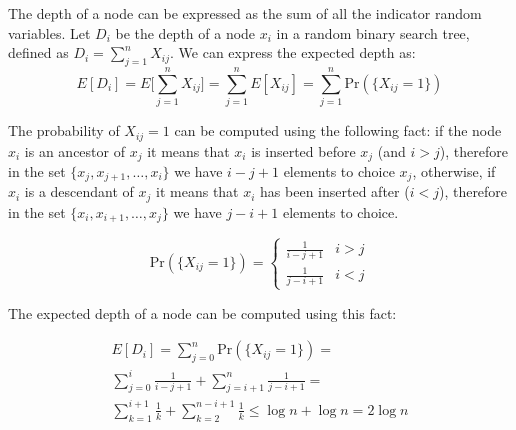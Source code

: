 \documentclass{article}
\begin{document}
\noindent The depth of a node can be expressed as the sum of all the indicator random variables. Let $D_i$ be the depth of a node $x_i$ in a random binary search tree, defined as $D_i = \sum_{j = 1}^{n} X_{ij}$. We can express the expected depth as:
\begin{equation}
E[D_i] = E\bigg[\sum_{j = 1}^{n} X_{ij}\bigg] = \sum_{j = 1}^{n} E[X_{ij}] = \sum_{j = 1}^{n} \textrm{Pr}(\{X_{ij} = 1\})
\end{equation}

\noindent The probability of $X_{ij} = 1$ can be computed using the following fact: if the node $x_i$ is an ancestor of $x_j$ it means that $x_i$ is inserted before $x_j$ (and $i > j$), therefore in the set $\{x_j, x_{j + 1}, \dots, x_{i}\}$ we have $i - j + 1$ elements to choice $x_j$, otherwise, if $x_i$ is a descendant of $x_j$ it means that $x_i$ has been inserted after ($i < j$), therefore in the set $\{x_{i}, x_{i + 1}, \dots, x_j\}$ we have $j - i +1$ elements to choice. 

\begin{equation}
    \textrm{Pr}(\{X_{ij} = 1\}) = \begin{cases}
        \frac{1}{i - j + 1} & i > j \\
        \frac{1}{j - i + 1} & i < j
    \end{cases}
\end{equation}

\noindent The expected depth of a node can be computed using this fact:

\begin{align*}
    E[D_i] = \sum_{j = 0}^{n} \textrm{Pr}(\{X_{ij} = 1\}) = \\ 
    \sum_{j = 0}^{i} \frac{1}{i - j + 1} + \sum_{j = i + 1}^{n} \frac{1}{j - i + 1} = \\
    \sum_{k = 1}^{i + 1} \frac{1}{k} + \sum_{k = 2}^{n - i + 1} \frac{1}{k} \le 
    \log{n} + \log{n} = 2 \log{n}
\end{align*}
\end{document}
